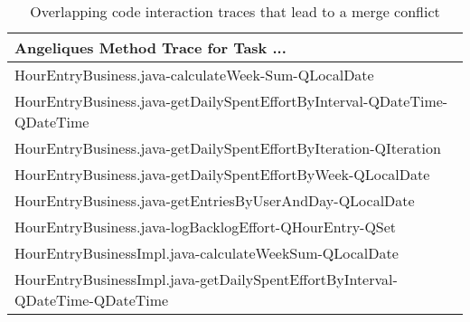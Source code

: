 \begin{table}[t!]
\centering\small
\caption{Overlapping code interaction traces that lead to a merge conflict}
\begin{tabular}{@{\hspace{2pt}}l@{\hspace{2pt}}}
\toprule
Angeliques Method Trace for Task ... \\%
\midrule
     HourEntryBusiness.java-calculateWeek-Sum-QLocalDate                                                                  \\%
     HourEntryBusiness.java-getDailySpentEffortByInterval-QDateTime-QDateTime                                    \\%
     HourEntryBusiness.java-getDailySpentEffortByIteration-QIteration                                                     \\%
     HourEntryBusiness.java-getDailySpentEffortByWeek-QLocalDate                                                           \\%
     HourEntryBusiness.java-getEntriesByUserAndDay-QLocalDate                                                            \\%
     HourEntryBusiness.java-logBacklogEffort-QHourEntry-QSet                                              \\%
     HourEntryBusinessImpl.java-calculateWeekSum-QLocalDate                                                   \\%
     HourEntryBusinessImpl.java-getDailySpentEffortByInterval-QDateTime-QDateTime                                  \\%

\end{tabular}
\end{table}
